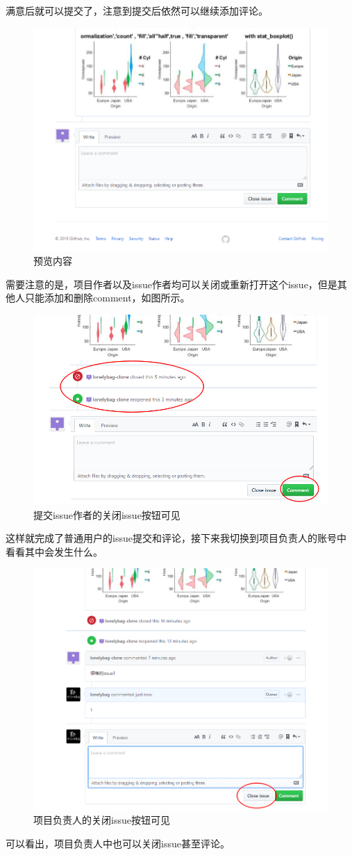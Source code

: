 \documentclass[UTF8,oneside]{ctexbook}
\begin{document}
满意后就可以提交了，注意到提交后依然可以继续添加评论。
\begin{figure}[H]
	\centering
	\includegraphics[width=0.6\linewidth]{Pics/issue6.png}
	\vspace{-0.3cm}
	\caption{预览内容}\label{fig:issue6}
\end{figure}

需要注意的是，项目作者以及issue作者均可以关闭或重新打开这个issue，但是其他人只能添加和删除comment，如图所示。
\begin{figure}[H]
	\centering
	\includegraphics[width=0.6\linewidth]{Pics/issue7.png}
	\vspace{-0.3cm}
    \caption{提交issue作者的关闭issue按钮可见}\label{fig:issue7}
\end{figure}

这样就完成了普通用户的issue提交和评论，接下来我切换到项目负责人的账号中看看其中会发生什么。
\begin{figure}[H]
	\centering
	\includegraphics[width=0.6\linewidth]{Pics/issue8.png}
	\vspace{-0.3cm}
	\caption{项目负责人的关闭issue按钮可见}\label{fig:issue8}
\end{figure}
可以看出，项目负责人中也可以关闭issue甚至评论。
\end{document}

